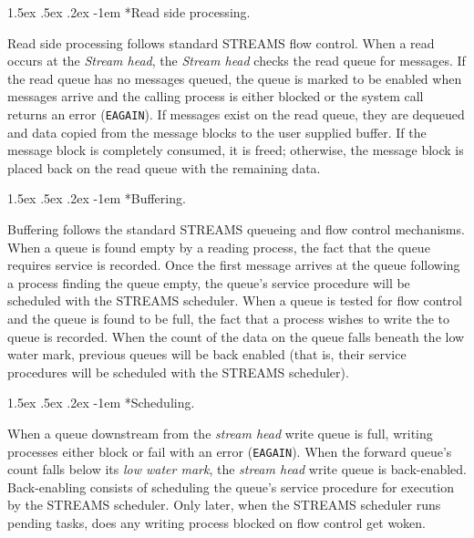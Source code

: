 \documentclass[letterpaper,final,notitlepage,twocolumn,10pt,twoside]{article}
\makeatletter
\renewcommand\paragraph{\@startsection{paragraph}{4}{\z@}%
                                    {1.5ex \@plus .5ex \@minus .2ex}%
                                    {-1em}%
                                    {\normalfont\normalsize\bfseries\slshape}}
\makeatother
\begin{document}
\paragraph*{Read side processing.}

Read side processing follows standard STREAMS flow control.  When a read occurs at the
\textit{Stream head}, the \textit{Stream head} checks the read queue for messages.  If the read
queue has no messages queued, the queue is marked to be enabled when messages arrive and the calling
process is either blocked or the system call returns an error (\texttt{EAGAIN}).  If messages exist
on the read queue, they are dequeued and data copied from the message blocks to the user supplied
buffer.  If the message block is completely consumed, it is freed; otherwise, the message block is
placed back on the read queue with the remaining data.

\paragraph*{Buffering.}

Buffering follows the standard STREAMS queueing and flow control mechanisms.  When a queue is found
empty by a reading process, the fact that the queue requires service is recorded.  Once the first
message arrives at the queue following a process finding the queue empty, the queue's service
procedure will be scheduled with the STREAMS scheduler.  When a queue is tested for flow control and
the queue is found to be full, the fact that a process wishes to write the to queue is recorded.
When the count of the data on the queue falls beneath the low water mark, previous queues will be
back enabled (that is, their service procedures will be scheduled with the STREAMS scheduler).

\paragraph*{Scheduling.}

When a queue downstream from the \textit{stream head} write queue is full, writing processes either
block or fail with an error (\texttt{EAGAIN}).  When the forward queue's count falls below its
\textit{low water mark}, the \textit{stream head} write queue is back-enabled.  Back-enabling
consists of scheduling the queue's service procedure for execution by the STREAMS scheduler.  Only
later, when the STREAMS scheduler runs pending tasks, does any writing process blocked on flow
control get woken.
\end{document}
